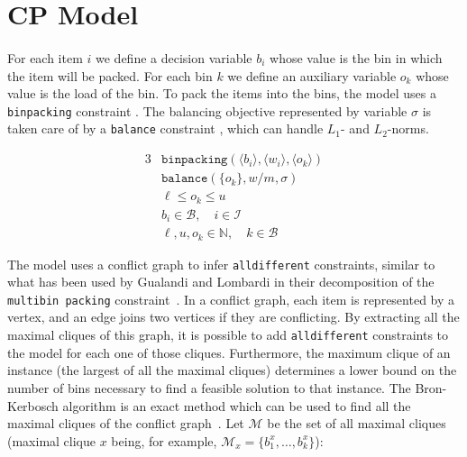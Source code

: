 \documentclass{llncs}
\begin{document}
\section{CP Model}
\label{sec:cp_model}

%

\paragraph{}For each item $i$ we define a decision variable $b_{i}$ whose value is the bin in which the item will be packed. For each bin $k$ we define an auxiliary variable $o_{k}$ whose value is the load of the bin. To pack the items into the bins, the model uses a \texttt{binpacking} constraint \cite{Shaw2004}. The balancing objective represented by variable $\sigma$ is taken care of by a \texttt{balance} constraint \cite{Pesant2015}, which can handle $L_{1}$- and $L_{2}$-norms.

\begin{alignat}{3}
  & \texttt{binpacking}\left(\langle b_{i} \rangle, \langle w_{i} \rangle, \langle o_{k} \rangle\right) \\
  & \texttt{balance}\left( \{o_{k}\}, w/m, \sigma \right) \\
  & \ell \leq o_{k} \leq u \\
  & b_{i} \in \mathcal{B}, \quad i \in \mathcal{I} \\
  & \ell, u, o_{k} \in \mathbb{N}, \quad k \in \mathcal{B}
\end{alignat}


The model uses a conflict graph to infer \texttt{alldifferent} constraints, similar to what has been used by Gualandi and Lombardi in their decomposition of the \texttt{multibin packing} constraint~\cite{Gualandi2013}. In a conflict graph, each item is represented by a vertex, and an edge joins two vertices if they are conflicting. By extracting all the maximal cliques of this graph, it is possible to add \texttt{alldifferent} constraints to the model for each one of those cliques. Furthermore, the maximum clique of an instance (the largest of all the maximal cliques) determines a lower bound on the number of bins necessary to find a feasible solution to that instance. The Bron-Kerbosch algorithm is an exact method which can be used to find all the maximal cliques of the conflict graph~\cite{Bron1973}. Let $\mathcal{M}$ be the set of all maximal cliques (maximal clique $x$ being, for example, $\mathcal{M}_{x} = \{b^{x}_{1}, \dots, b^{x}_{k}\}$):
\end{document}
